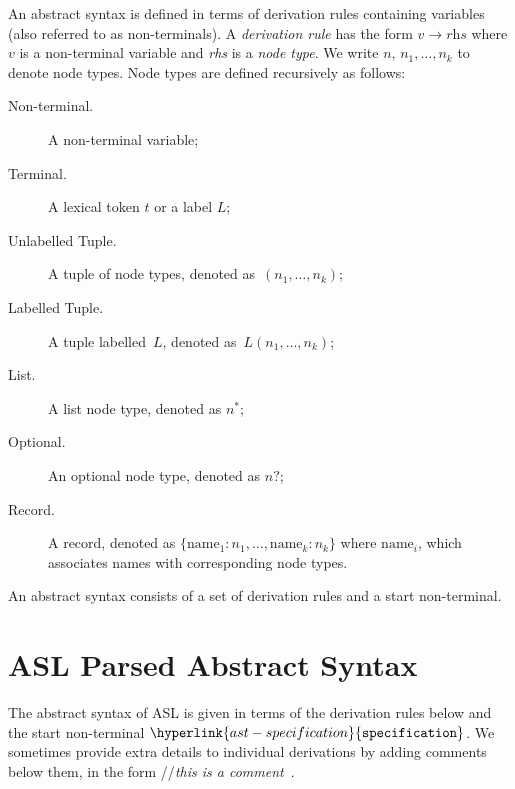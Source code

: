 \documentclass{book}
\newcommand\derives[0]{\longrightarrow}
\renewcommand\specification[0]{\hyperlink{ast-specification}{\texttt{specification}}}
\begin{document}
An abstract syntax is defined in terms of derivation rules containing variables (also referred to as non-terminals).
%
A \emph{derivation rule} has the form $v \derives \textit{rhs}$ where $v$ is a non-terminal variable and \textit{rhs} is a \emph{node type}. We write $n$, $n_1,\ldots,n_k$ to denote node types.
%
Node types are defined recursively as follows:
\begin{description}
\item[Non-terminal.] A non-terminal variable;
\item[Terminal.] A lexical token $t$ or a label $L$;
\item[Unlabelled Tuple.] A tuple of node types, denoted as~$(n_1,\ldots,n_k)$;
\item[Labelled Tuple.] A tuple labelled~$L$, denoted as~$L(n_1,\ldots,n_k)$;
\item[List.] A list node type, denoted as $n^{*}$;
\item[Optional.] An optional node type, denoted as $n?$;
\item[Record.] A record, denoted as $\{\text{name}_1 : n_1,\ldots,\text{name}_k : n_k\}$ where $\text{name}_i$, which associates names with corresponding node types.
\end{description}

\newpage

An abstract syntax consists of a set of derivation rules and a start non-terminal.

\newcommand\ASTComment[1]{//\quad\textit{#1}\ }

\section{ASL Parsed Abstract Syntax}

The abstract syntax of ASL is given in terms of the derivation rules below and the start non-terminal $\specification$.
%
We sometimes provide extra details to individual derivations by adding comments below them, in the form \ASTComment{this is a comment}.
\end{document}
